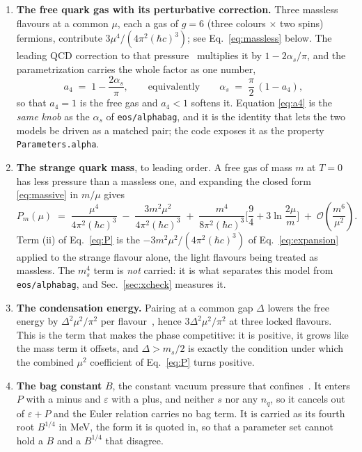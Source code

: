 \documentclass[aps,prc,onecolumn,superscriptaddress,nofootinbib,10pt]{revtex4-2}
\newcommand{\hc}{(\hbar c)^3}
\newcommand{\as}{\alpha_s}
\newcommand{\ms}{m_s}
\begin{document}
\begin{enumerate}
\item[(i)] \textbf{The free quark gas with its perturbative correction.}
  Three massless flavours at a common $\mu$, each a gas of $g = 6$ (three
  colours $\times$ two spins) fermions, contribute $3 \mu^4/(4\pi^2\hc)$; see
  Eq.~\eqref{eq:massless} below. The leading QCD correction to that
  pressure~\cite{FreedmanMcLerran1977} multiplies it by $1 - 2\as/\pi$, and
  the parametrization carries the whole factor as one number,
  \begin{equation}
  a_4 \;=\; 1 - \frac{2\as}{\pi} , \qquad\text{equivalently}\qquad
  \as \;=\; \frac{\pi}{2}\,(1 - a_4) ,
  \label{eq:a4}
  \end{equation}
  so that $a_4 = 1$ is the free gas and $a_4 < 1$ softens it. Equation
  \eqref{eq:a4} is the \emph{same knob} as the $\as$ of
  \texttt{eos/alphabag}, and it is the identity that lets the two models be
  driven as a matched pair; the code exposes it as the property
  \texttt{Parameters.alpha}.

\item[(ii)] \textbf{The strange quark mass}, to leading order. A free gas of
  mass $m$ at $T = 0$ has less pressure than a massless one, and expanding the
  closed form \eqref{eq:massive} in $m/\mu$ gives
  \begin{equation}
  P_m(\mu) \;=\; \frac{\mu^4}{4\pi^2\hc} \;-\; \frac{3 m^2 \mu^2}{4\pi^2\hc}
                 \;+\; \frac{m^4}{8\pi^2\hc}
                       \Big[\frac{9}{4} + 3\ln\frac{2\mu}{m}\Big]
                 \;+\; \mathcal{O}\!\left(\frac{m^6}{\mu^2}\right) .
  \label{eq:expansion}
  \end{equation}
  Term (ii) of Eq.~\eqref{eq:P} is the $-3m^2\mu^2/(4\pi^2\hc)$ of
  Eq.~\eqref{eq:expansion} applied to the strange flavour alone, the light
  flavours being treated as massless. The $\ms^4$ term is \emph{not} carried:
  it is what separates this model from \texttt{eos/alphabag}, and
  Sec.~\ref{sec:xcheck} measures it.

\item[(iii)] \textbf{The condensation energy.} Pairing at a common gap
  $\Delta$ lowers the free energy by $\Delta^2\mu^2/\pi^2$ per
  flavour~\cite{AlfordRajagopalWilczek1999,AlfordBrabyParisReddy2005}, hence
  $3\Delta^2\mu^2/\pi^2$ at three locked flavours. This is the term that makes
  the phase competitive: it is positive, it grows like the mass term it
  offsets, and $\Delta > \ms/2$ is exactly the condition under which the
  combined $\mu^2$ coefficient of Eq.~\eqref{eq:P} turns positive.

\item[(iv)] \textbf{The bag constant} $B$, the constant vacuum pressure that
  confines~\cite{Chodos1974}. It enters $P$ with a minus and $\varepsilon$
  with a plus, and neither $s$ nor any $n_q$, so it cancels out of
  $\varepsilon + P$ and the Euler relation carries no bag term. It is carried
  as its fourth root $B^{1/4}$ in MeV, the form it is quoted in, so that a
  parameter set cannot hold a $B$ and a $B^{1/4}$ that disagree.
\end{enumerate}
\end{document}
